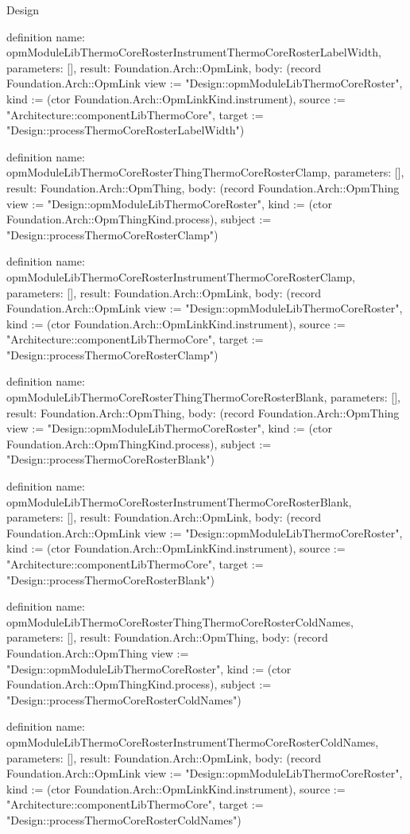 \begin{lexlean}{Design}
\begin{semanticmodule}
definition{
  name: opmModuleLibThermoCoreRosterInstrumentThermoCoreRosterLabelWidth,
  parameters: [],
  result: Foundation.Arch::OpmLink,
  body: (record Foundation.Arch::OpmLink {view := "Design::opmModuleLibThermoCoreRoster", kind := (ctor Foundation.Arch::OpmLinkKind.instrument), source := "Architecture::componentLibThermoCore", target := "Design::processThermoCoreRosterLabelWidth"})
}

definition{
  name: opmModuleLibThermoCoreRosterThingThermoCoreRosterClamp,
  parameters: [],
  result: Foundation.Arch::OpmThing,
  body: (record Foundation.Arch::OpmThing {view := "Design::opmModuleLibThermoCoreRoster", kind := (ctor Foundation.Arch::OpmThingKind.process), subject := "Design::processThermoCoreRosterClamp"})
}

definition{
  name: opmModuleLibThermoCoreRosterInstrumentThermoCoreRosterClamp,
  parameters: [],
  result: Foundation.Arch::OpmLink,
  body: (record Foundation.Arch::OpmLink {view := "Design::opmModuleLibThermoCoreRoster", kind := (ctor Foundation.Arch::OpmLinkKind.instrument), source := "Architecture::componentLibThermoCore", target := "Design::processThermoCoreRosterClamp"})
}

definition{
  name: opmModuleLibThermoCoreRosterThingThermoCoreRosterBlank,
  parameters: [],
  result: Foundation.Arch::OpmThing,
  body: (record Foundation.Arch::OpmThing {view := "Design::opmModuleLibThermoCoreRoster", kind := (ctor Foundation.Arch::OpmThingKind.process), subject := "Design::processThermoCoreRosterBlank"})
}

definition{
  name: opmModuleLibThermoCoreRosterInstrumentThermoCoreRosterBlank,
  parameters: [],
  result: Foundation.Arch::OpmLink,
  body: (record Foundation.Arch::OpmLink {view := "Design::opmModuleLibThermoCoreRoster", kind := (ctor Foundation.Arch::OpmLinkKind.instrument), source := "Architecture::componentLibThermoCore", target := "Design::processThermoCoreRosterBlank"})
}

definition{
  name: opmModuleLibThermoCoreRosterThingThermoCoreRosterColdNames,
  parameters: [],
  result: Foundation.Arch::OpmThing,
  body: (record Foundation.Arch::OpmThing {view := "Design::opmModuleLibThermoCoreRoster", kind := (ctor Foundation.Arch::OpmThingKind.process), subject := "Design::processThermoCoreRosterColdNames"})
}

definition{
  name: opmModuleLibThermoCoreRosterInstrumentThermoCoreRosterColdNames,
  parameters: [],
  result: Foundation.Arch::OpmLink,
  body: (record Foundation.Arch::OpmLink {view := "Design::opmModuleLibThermoCoreRoster", kind := (ctor Foundation.Arch::OpmLinkKind.instrument), source := "Architecture::componentLibThermoCore", target := "Design::processThermoCoreRosterColdNames"})
}


\end{semanticmodule}
\end{lexlean}
